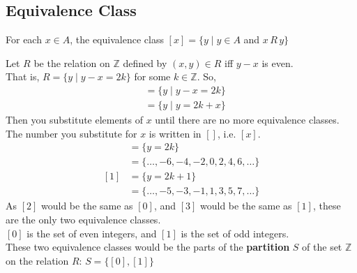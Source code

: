 \documentclass[../notes.tex]{subfiles}
\begin{document}
			\subsection{Equivalence Class}
				For each $x \in A$, the equivalence class $[x] = \{y \mid y \in A$ and $ x \, R \, y\}$
				\begin{example}
					Let $R$ be the relation on $\mathbb{Z}$ defined by $(x, y) \in R$ iff $y - x$ is even.\\
					That is, $R = \{y \mid y - x = 2k\}$ for some $k \in \mathbb{Z}$.
					So,
					\begin{align*}
						[x] &= \{y \mid y - x = 2k\}\\
						&= \{y \mid y = 2k + x\}
					\end{align*}
					Then you substitute elements of $x$ until there are no more equivalence classes.\\
					The number you substitute for $x$ is written in $[]$, i.e. $[x]$.
					\begin{align*}
						[0] &= \{y = 2k\}\\
						&= \{\ldots, -6, -4, -2, 0, 2, 4, 6, \ldots\}\\
						[1] &= \{y = 2k + 1\}\\
						&= \{\ldots, -5, -3, -1, 1, 3, 5, 7, \ldots\}
					\end{align*}
					As $[2]$ would be the same as $[0]$, and $[3]$ would be the same as $[1]$, these are the only two equivalence classes.\\
					$[0]$ is the set of even integers, and $[1]$ is the set of odd integers.\\
					These two equivalence classes would be the parts of the \textbf{partition} $S$ of the set $\mathbb{Z}$ on the relation $R$: $S = \bigl\{[0], [1]\bigr\}$
				\end{example}
\end{document}
